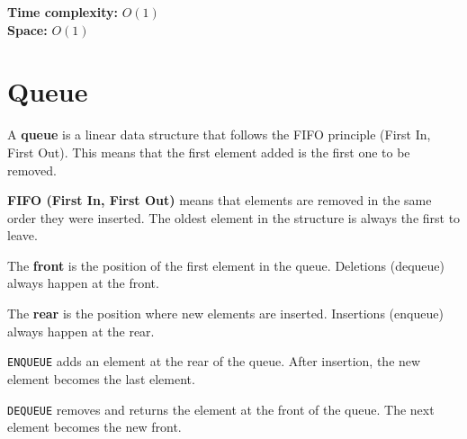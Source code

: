 \documentclass[11pt,a4paper,openany]{book}
\begin{document}
\textbf{Time complexity:} $O(1)$ \\

\textbf{Space:} $O(1)$













\vspace{2cm}













\chapter{Queue}


\begin{defnbox}[title=Queue (file)]
A \textbf{queue} is a linear data structure that follows the FIFO principle
(First In, First Out).  
This means that the first element added is the first one to be removed.
\end{defnbox}

\begin{defnbox}[title=FIFO principle]
\textbf{FIFO (First In, First Out)} means that elements are removed in the same order they were inserted.  
The oldest element in the structure is always the first to leave.
\end{defnbox}

\begin{defnbox}[title=Front]
The \textbf{front} is the position of the first element in the queue.  
Deletions (dequeue) always happen at the front.
\end{defnbox}

\begin{defnbox}[title=Rear]
The \textbf{rear} is the position where new elements are inserted.  
Insertions (enqueue) always happen at the rear.
\end{defnbox}

\begin{defnbox}[title=Enqueue operation]
\texttt{ENQUEUE} adds an element at the rear of the queue.  
After insertion, the new element becomes the last element.
\end{defnbox}

\begin{defnbox}[title=Dequeue operation]
\texttt{DEQUEUE} removes and returns the element at the front of the queue.  
The next element becomes the new front.
\end{defnbox}
\end{document}
